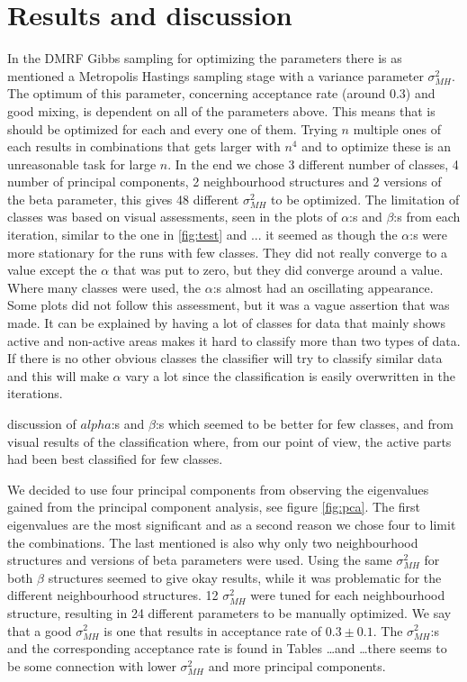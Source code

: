 \documentclass[a4paper,english]{article}
\begin{document}
\section{Results and discussion}

In the DMRF Gibbs sampling for optimizing the parameters there is as mentioned a Metropolis Hastings sampling stage with a variance parameter  $\sigma_{MH}^2$.
The optimum of this parameter, concerning acceptance rate (around $0.3$) and good mixing, is dependent on all of the parameters above. %
This means that is should be optimized for each and every one of them.
Trying $n$ multiple ones of each results in combinations that gets larger with $n^4$ and to optimize these is an unreasonable task for large $n$.
In the end we chose 3 different number of classes, 4 number of principal components, 2 neighbourhood structures and 2 versions of the beta parameter, this gives 48 different $\sigma_{MH}^2$ to be optimized. The limitation of classes was based on visual assessments, seen in the plots of $\alpha$:s and $\beta$:s from each iteration, similar to the one in \ref{fig:test} and ... it seemed as though the $\alpha$:s were more stationary for the runs with few classes. They did not really converge to a value except the $\alpha$ that was put to zero, but they did converge around a value. Where many classes were used, the $\alpha$:s almost had an oscillating appearance. Some plots did not follow this assessment, but it was a vague assertion that was made.
It can be explained by having a lot of classes for data that mainly shows active and non-active areas makes it hard to classify more than two types of data. If there is no other obvious classes the classifier will try to classify similar data and this will make $\alpha$ vary a lot since the classification is easily overwritten in the iterations.


 discussion of $alpha$:s and $\beta$:s which seemed to be better for few classes, and from visual results of the classification where, from our point of view, the active parts had been best classified for few classes.

 We decided to use four principal components from observing the eigenvalues gained from the principal component analysis, see figure \ref{fig:pca}. The first eigenvalues are the most significant and as a second reason we chose four to limit the combinations. The last mentioned is also why only two neighbourhood structures and versions of beta parameters were used.  
Using the same $\sigma_{MH}^2$ for both $\beta$ structures seemed to give okay results, while it was problematic for the different neighbourhood structures. 12 $\sigma_{MH}^2$ were tuned for each neighbourhood structure, resulting in 24 different parameters to be manually optimized.
We say that a good $\sigma_{MH}^2$ is one that results in acceptance rate of $0.3 \pm 0.1$.
The $\sigma_{MH}^2$:s and the corresponding acceptance rate is found in Tables \dots and \dots there seems to be some connection with lower $\sigma_{MH}^2$ and more principal components.
\end{document}
